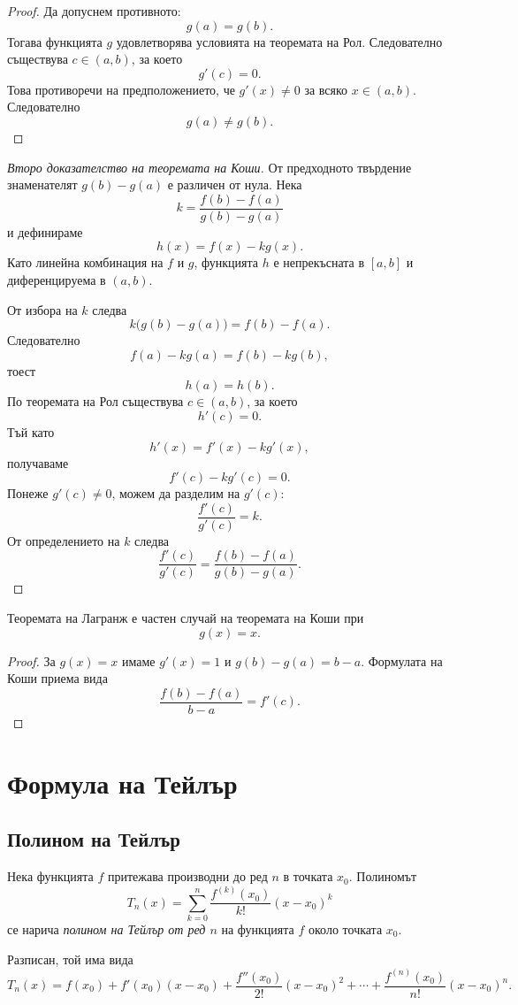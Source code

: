 \begin{proof}
Да допуснем противното:
\[
g(a)=g(b).
\]
Тогава функцията $g$ удовлетворява условията на теоремата на Рол. Следователно съществува $c\in(a,b)$, за което
\[
g'(c)=0.
\]
Това противоречи на предположението, че $g'(x)\ne 0$ за всяко $x\in(a,b)$. Следователно
\[
g(a)\ne g(b).
\]
\end{proof}

\begin{proof}[Второ доказателство на теоремата на Коши]
От предходното твърдение знаменателят $g(b)-g(a)$ е различен от нула. Нека
\[
k=\frac{f(b)-f(a)}{g(b)-g(a)}
\]
и дефинираме
\[
h(x)=f(x)-k g(x).
\]
Като линейна комбинация на $f$ и $g$, функцията $h$ е непрекъсната в $[a,b]$ и диференцируема в $(a,b)$.

От избора на $k$ следва
\[
k\bigl(g(b)-g(a)\bigr)=f(b)-f(a).
\]
Следователно
\[
f(a)-kg(a)=f(b)-kg(b),
\]
тоест
\[
h(a)=h(b).
\]
По теоремата на Рол съществува $c\in(a,b)$, за което
\[
h'(c)=0.
\]
Тъй като
\[
h'(x)=f'(x)-k g'(x),
\]
получаваме
\[
f'(c)-k g'(c)=0.
\]
Понеже $g'(c)\ne 0$, можем да разделим на $g'(c)$:
\[
\frac{f'(c)}{g'(c)}=k.
\]
От определението на $k$ следва
\[
\frac{f'(c)}{g'(c)}
=
\frac{f(b)-f(a)}{g(b)-g(a)}.
\]
\end{proof}

\begin{cor}
Теоремата на Лагранж е частен случай на теоремата на Коши при
\[
g(x)=x.
\]
\end{cor}

\begin{proof}
За $g(x)=x$ имаме $g'(x)=1$ и $g(b)-g(a)=b-a$. Формулата на Коши приема вида
\[
\frac{f(b)-f(a)}{b-a}=f'(c).
\]
\end{proof}

\section{Формула на Тейлър}\label{s:32.3}

\subsection{Полином на Тейлър}\label{s:32.3.1}

\begin{defn}
Нека функцията $f$ притежава производни до ред $n$ в точката $x_0$. Полиномът
\[
T_n(x)=\sum_{k=0}^{n}\frac{f^{(k)}(x_0)}{k!}(x-x_0)^k
\]
се нарича \emph{полином на Тейлър от ред $n$} на функцията $f$ около точката $x_0$.

Разписан, той има вида
\[
T_n(x)=f(x_0)+f'(x_0)(x-x_0)
+\frac{f''(x_0)}{2!}(x-x_0)^2+\cdots
+\frac{f^{(n)}(x_0)}{n!}(x-x_0)^n.
\]
\end{defn}

